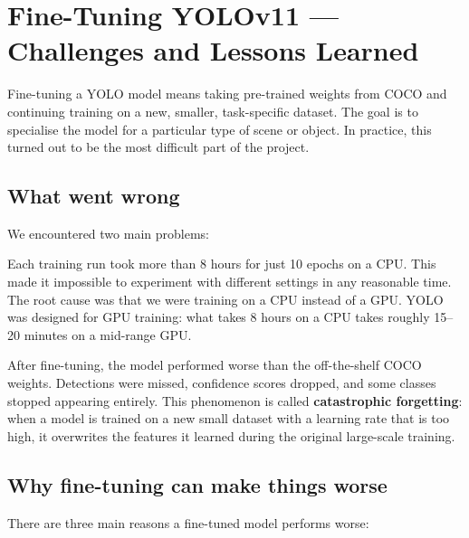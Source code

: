 \documentclass[12pt,a4paper,leqno]{report}
\begin{document}
\section{Fine-Tuning YOLOv11 — Challenges and Lessons Learned}

Fine-tuning a YOLO model means taking pre-trained weights from COCO and continuing training on a new, smaller, task-specific dataset. The goal is to specialise the model for a particular type of scene or object. In practice, this turned out to be the most difficult part of the project.

\subsection{What went wrong}

We encountered two main problems:

\begin{warnbox}
Each training run took more than 8 hours for just 10 epochs on a CPU. This made it impossible to experiment with different settings in any reasonable time. The root cause was that we were training on a CPU instead of a GPU. YOLO was designed for GPU training: what takes 8 hours on a CPU takes roughly 15--20 minutes on a mid-range GPU.
\end{warnbox}

\begin{warnbox}
After fine-tuning, the model performed worse than the off-the-shelf COCO weights. Detections were missed, confidence scores dropped, and some classes stopped appearing entirely. This phenomenon is called \textbf{catastrophic forgetting}: when a model is trained on a new small dataset with a learning rate that is too high, it overwrites the features it learned during the original large-scale training.
\end{warnbox}

\subsection{Why fine-tuning can make things worse}

There are three main reasons a fine-tuned model performs worse:
\end{document}
